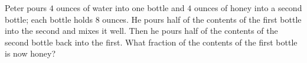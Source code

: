 Peter pours $4$ ounces of water into one bottle and $4$ ounces of honey into a second bottle; each bottle holds $8$ ounces. He pours half of the contents of the first bottle into the second and mixes it well. Then he pours half of the contents of the second bottle back into the first. What fraction of the contents of the first bottle is now honey?
